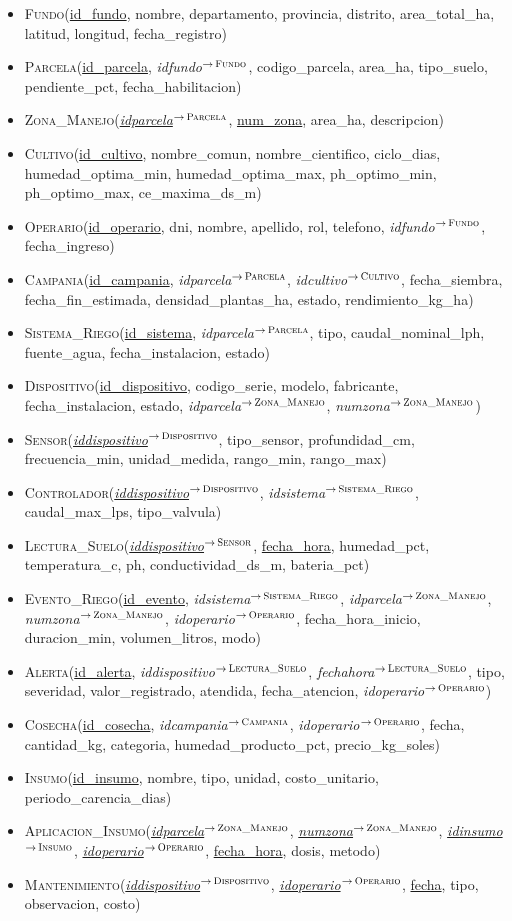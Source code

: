 \documentclass[11pt,letterpaper]{article}
\newcommand{\tbus}{\textunderscore\allowbreak}
\newcommand{\pk}[1]{\underline{#1}}
\newcommand{\fk}[2]{{\itshape\let\_\tbus #1}$^{\to\,\textsc{\let\_\tbus #2}}$}
\newcommand{\relacion}[1]{\item\begin{minipage}[t]{\linewidth}\raggedright #1\par\end{minipage}}
\begin{document}
\begin{itemize}[leftmargin=1.2em,itemsep=0.3em]
\relacion{\textsc{Fundo}(\pk{id\_fundo}, nombre, departamento, provincia, distrito, area\_total\_ha, latitud, longitud, fecha\_registro)}
\relacion{\textsc{Parcela}(\pk{id\_parcela}, \fk{id\_fundo}{Fundo}, codigo\_parcela, area\_ha, tipo\_suelo, pendiente\_pct, fecha\_habilitacion)}
\relacion{\textsc{Zona\_Manejo}(\pk{\fk{id\_parcela}{Parcela}}, \pk{num\_zona}, area\_ha, descripcion)}
\relacion{\textsc{Cultivo}(\pk{id\_cultivo}, nombre\_comun, nombre\_cientifico, ciclo\_dias, humedad\_optima\_min, humedad\_optima\_max, ph\_optimo\_min, ph\_optimo\_max, ce\_maxima\_ds\_m)}
\relacion{\textsc{Operario}(\pk{id\_operario}, dni, nombre, apellido, rol, telefono, \fk{id\_fundo}{Fundo}, fecha\_ingreso)}
\relacion{\textsc{Campania}(\pk{id\_campania}, \fk{id\_parcela}{Parcela}, \fk{id\_cultivo}{Cultivo}, fecha\_siembra, fecha\_fin\_estimada, densidad\_plantas\_ha, estado, rendimiento\_kg\_ha)}
\relacion{\textsc{Sistema\_Riego}(\pk{id\_sistema}, \fk{id\_parcela}{Parcela}, tipo, caudal\_nominal\_lph, fuente\_agua, fecha\_instalacion, estado)}
\relacion{\textsc{Dispositivo}(\pk{id\_dispositivo}, codigo\_serie, modelo, fabricante, fecha\_instalacion, estado, \fk{id\_parcela}{Zona\_Manejo}, \fk{num\_zona}{Zona\_Manejo})}
\relacion{\textsc{Sensor}(\pk{\fk{id\_dispositivo}{Dispositivo}}, tipo\_sensor, profundidad\_cm, frecuencia\_min, unidad\_medida, rango\_min, rango\_max)}
\relacion{\textsc{Controlador}(\pk{\fk{id\_dispositivo}{Dispositivo}}, \fk{id\_sistema}{Sistema\_Riego}, caudal\_max\_lps, tipo\_valvula)}
\relacion{\textsc{Lectura\_Suelo}(\pk{\fk{id\_dispositivo}{Sensor}}, \pk{fecha\_hora}, humedad\_pct, temperatura\_c, ph, conductividad\_ds\_m, bateria\_pct)}
\relacion{\textsc{Evento\_Riego}(\pk{id\_evento}, \fk{id\_sistema}{Sistema\_Riego}, \fk{id\_parcela}{Zona\_Manejo}, \fk{num\_zona}{Zona\_Manejo}, \fk{id\_operario}{Operario}, fecha\_hora\_inicio, duracion\_min, volumen\_litros, modo)}
\relacion{\textsc{Alerta}(\pk{id\_alerta}, \fk{id\_dispositivo}{Lectura\_Suelo}, \fk{fecha\_hora}{Lectura\_Suelo}, tipo, severidad, valor\_registrado, atendida, fecha\_atencion, \fk{id\_operario}{Operario})}
\relacion{\textsc{Cosecha}(\pk{id\_cosecha}, \fk{id\_campania}{Campania}, \fk{id\_operario}{Operario}, fecha, cantidad\_kg, categoria, humedad\_producto\_pct, precio\_kg\_soles)}
\relacion{\textsc{Insumo}(\pk{id\_insumo}, nombre, tipo, unidad, costo\_unitario, periodo\_carencia\_dias)}
\relacion{\textsc{Aplicacion\_Insumo}(\pk{\fk{id\_parcela}{Zona\_Manejo}}, \pk{\fk{num\_zona}{Zona\_Manejo}}, \pk{\fk{id\_insumo}{Insumo}}, \pk{\fk{id\_operario}{Operario}}, \pk{fecha\_hora}, dosis, metodo)}
\relacion{\textsc{Mantenimiento}(\pk{\fk{id\_dispositivo}{Dispositivo}}, \pk{\fk{id\_operario}{Operario}}, \pk{fecha}, tipo, observacion, costo)}
\end{itemize}
\end{document}
